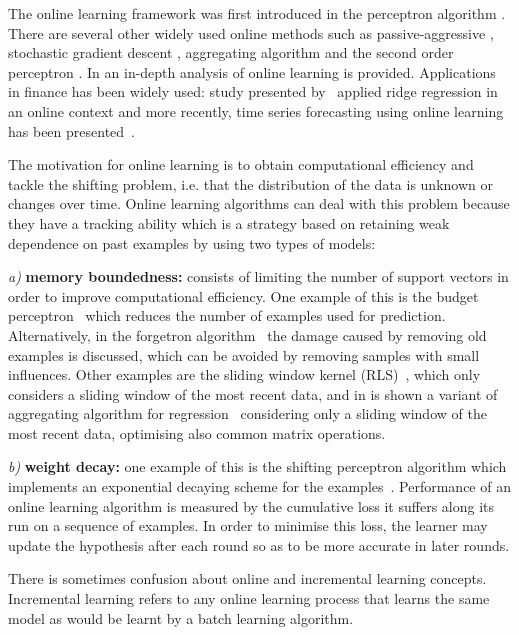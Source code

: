 The online learning framework was first introduced in the perceptron algorithm
\cite{rosenblatt58}. There are several other widely used online methods such as
passive-aggressive \cite{crammerETall2006}, stochastic gradient descent
\cite{zhang2004}, aggregating algorithm \cite{vovk2001} and the second order
perceptron \cite{cesa-bianchi2005}.  In \cite{cesa-bianchi2006} an in-depth
analysis of online learning is provided. Applications in finance has been widely used: study presented by~\cite{arce+salinas2012} applied ridge regression in an online context and more recently, time series forecasting using online learning has been presented~\cite{anavaetAl2013}.

The motivation for online learning is to obtain computational efficiency and
tackle the shifting problem, i.e. that the distribution of the data is unknown
or changes over time. Online learning algorithms can deal with this problem
because they have a tracking ability which is a strategy based on retaining weak
dependence on past examples by using two types of models: 

\textit{a)} \textbf{memory boundedness:} consists of limiting the number of
support vectors in order to improve computational efficiency. One example of
this is the budget perceptron~\cite{crammeretal2004} which reduces the number of
examples used for prediction. Alternatively, in the forgetron
algorithm~\cite{dekeletal2008} the damage caused by removing old examples is
discussed, which can be avoided by removing samples with small influences. Other
examples are the sliding window kernel (RLS)~\cite{vanvaerenberghetal2006},
which only considers a sliding window of the most recent data, and in
\cite{arce+salinas2012} is shown a variant of aggregating algorithm for
regression~\cite{vovk2001} considering only a sliding window of the most recent
data, optimising also common matrix operations.

\textit{b)} \textbf{weight decay:} one example of this is the shifting
perceptron algorithm which implements an exponential decaying scheme for the
examples~\cite{cavallantietal2007}.  Performance of an online learning algorithm
is measured by the cumulative loss it suffers along its run on a sequence of
examples. In order to minimise this loss, the learner may update the hypothesis
after each round so as to be more accurate in later rounds.


There is sometimes confusion about online and incremental learning concepts.
Incremental learning refers to any online learning process that learns the same
model as would be learnt by a batch learning algorithm. 

